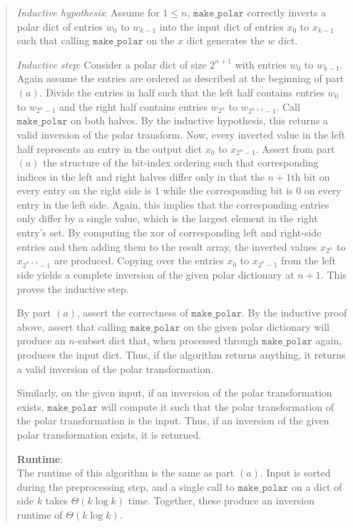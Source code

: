 \documentclass[11pt]{article}
\newcommand{\code}[1]{$\texttt{#1}$}
\begin{document}
\begin{enumerate}
\begin{enumerate}
\begin{quote}
      \medskip
      \textit{Inductive hypothesis}: Assume for $1 \leq n$, \code{make\_polar} correctly inverts a polar dict of entries $w_0$ to $w_{k - 1}$ into the input dict of entries $x_0$ to $x_{k - 1}$ such that calling \code{make\_polar} on the $x$ dict generates the $w$ dict.

      \medskip
      \textit{Inductive step}: Consider a polar dict of size $2^{n + 1}$ with entries $w_0$ to $w_{k - 1}$. Again assume the entries are ordered as described at the beginning of part $(a)$. Divide the entries in half such that the left half contains entries $w_0$ to $w_{2^n - 1}$ and the right half contains entries $w_{2^n}$ to $w_{2^{n + 1} - 1}$. Call \code{make\_polar} on both halves. By the inductive hypothesis, this returns a valid inversion of the polar transform. Now, every inverted value in the left half represents an entry in the output dict $x_0$ to $x_{2^n - 1}$. Assert from part $(a)$ the structure of the bit-index ordering such that corresponding indices in the left and right halves differ only in that the $n + 1$th bit on every entry on the right side is $1$ while the corresponding bit is $0$ on every entry in the left side. Again, this implies that the corresponding entries only differ by a single value, which is the largest element in the right entry's set. By computing the xor of corresponding left and right-side entries and then adding them to the result array, the inverted values $x_{2^n}$ to $x_{2^{n + 1} - 1}$ are produced. Copying over the entries $x_0$ to $x_{2^n - 1}$ from the left side yields a complete inversion of the given polar dictionary at $n + 1$. This proves the inductive step.

      \medskip
      By part $(a)$, assert the correctness of \code{make\_polar}. By the inductive proof above, assert that calling \code{make\_polar} on the given polar dictionary will produce an $n$-subset dict that, when processed through \code{make\_polar} again, produces the input dict. Thus, if the algorithm returns anything, it returns a valid inversion of the polar transformation. 

      \medskip
      Similarly, on the given input, if an inversion of the polar transformation exists, \code{make\_polar} will compute it such that the polar transformation of the polar transformation is the input. Thus, if an inversion of the given polar transformation exists, it is returned.

      \medskip
      \textbf{Runtime}: \\ 
      The runtime of this algorithm is the same as part $(a)$. Input is sorted during the preprocessing step, and a single call to \code{make\_polar} on a dict of side $k$ takes $\Theta(k \log k)$ time. Together, these produce an inversion runtime of $\Theta(k \log k)$. 
    \end{quote}
\end{enumerate}


\end{enumerate}
\end{document}
